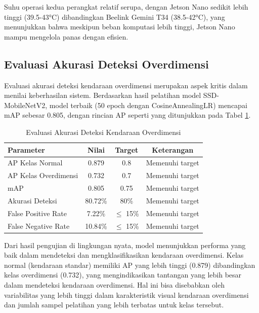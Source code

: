 Suhu operasi kedua perangkat relatif serupa, dengan Jetson Nano sedikit lebih tinggi (39.5-43°C) dibandingkan Beelink Gemini T34 (38.5-42°C), yang menunjukkan bahwa meskipun beban komputasi lebih tinggi, Jetson Nano mampu mengelola panas dengan efisien.

\subsection{Evaluasi Akurasi Deteksi Overdimensi}

Evaluasi akurasi deteksi kendaraan overdimensi merupakan aspek kritis dalam menilai keberhasilan sistem. Berdasarkan hasil pelatihan model SSD-MobileNetV2, model terbaik (50 epoch dengan CosineAnnealingLR) mencapai mAP sebesar 0.805, dengan rincian AP seperti yang ditunjukkan pada Tabel \ref{tab:od_accuracy}.

\begin{table}[htbp]
  \centering
  \setlength{\tabcolsep}{4pt}
  \small
  \begin{tabular}{|l|c|c|c|}
  \hline
  \rowcolor[HTML]{C0C0C0}
  \textbf{Parameter} & \textbf{Nilai} & \textbf{Target} & \textbf{Keterangan} \\
  \hline
  AP Kelas Normal & 0.879 & 0.8 & Memenuhi target \\
  \hline
  AP Kelas Overdimensi & 0.732 & 0.7 & Memenuhi target \\
  \hline
  mAP & 0.805 & 0.75 & Memenuhi target \\
  \hline
  Akurasi Deteksi & 80.72\% & 80\% & Memenuhi target \\
  \hline
  False Positive Rate & 7.22\% & $\leq$ 15\% & Memenuhi target \\
  \hline
  False Negative Rate & 10.84\% & $\leq$ 15\% & Memenuhi target \\
  \hline
  \end{tabular}
  \caption{Evaluasi Akurasi Deteksi Kendaraan Overdimensi}
  \label{tab:od_accuracy}
\end{table}

Dari hasil pengujian di lingkungan nyata, model menunjukkan performa yang baik dalam mendeteksi dan mengklasifikasikan kendaraan overdimensi. Kelas normal (kendaraan standar) memiliki AP yang lebih tinggi (0.879) dibandingkan kelas overdimensi (0.732), yang mengindikasikan tantangan yang lebih besar dalam mendeteksi kendaraan overdimensi. Hal ini bisa disebabkan oleh variabilitas yang lebih tinggi dalam karakteristik visual kendaraan overdimensi dan jumlah sampel pelatihan yang lebih terbatas untuk kelas tersebut.


